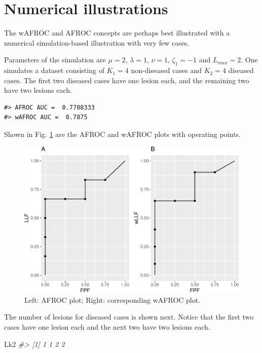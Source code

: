 \documentclass[
]{book}
\newenvironment{Shaded}{\begin{snugshade}}{\end{snugshade}}
\newcommand{\CommentTok}[1]{\textcolor[rgb]{0.56,0.35,0.01}{\textit{#1}}}
\newcommand{\NormalTok}[1]{#1}
\begin{document}
\hypertarget{froc-meanings-numerical-illustrations}{%
\section{Numerical illustrations}\label{froc-meanings-numerical-illustrations}}

The wAFROC and AFROC concepts are perhaps best illustrated with a numerical simulation-based illustration with very few cases.

Parameters of the simulation are \(\mu = 2\), \(\lambda = 1\), \(\nu = 1\), \(\zeta_1 = -1\) and \(L_{max} = 2\). One simulates a dataset consisting of \(K_1 = 4\) non-diseased cases and \(K_2 = 4\) diseased cases. The first two diseased cases have one lesion each, and the remaining two have two lesions each.

\begin{verbatim}
#> AFROC AUC =  0.7708333
#> wAFROC AUC =  0.7875
\end{verbatim}

Shown in Fig. \ref{fig:plots-p1-p2} are the AFROC and wAFROC plots with operating points.

\begin{figure}
\centering
\includegraphics{14-froc-meanings-foms-ocs_files/figure-latex/plots-p1-p2-1.pdf}
\caption{\label{fig:plots-p1-p2}Left: AFROC plot; Right: corresponding wAFROC plot.}
\end{figure}

The number of lesions for diseased cases is shown next. Notice that the first two cases have one lesion each and the next two have two lesions each.

\begin{Shaded}
\begin{Highlighting}[]
\NormalTok{Lk2}
\CommentTok{\#\textgreater{} [1] 1 1 2 2}
\end{Highlighting}
\end{Shaded}
\end{document}
